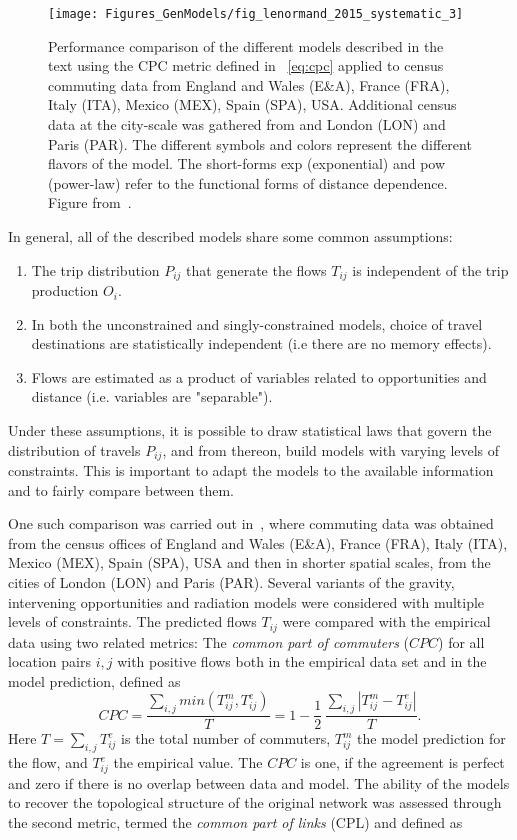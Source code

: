 \begin{figure}[t!]
\centering
\texttt{[image: Figures\_GenModels/fig\_lenormand\_2015\_systematic\_3]}
\caption{Performance comparison of the different models described in the text using the CPC metric defined in \equationname~\eqref{eq:cpc} applied to census commuting data from England and Wales (E\&A), France (FRA), Italy (ITA), Mexico (MEX), Spain (SPA), USA. Additional census data at the city-scale was gathered from and London (LON) and Paris (PAR). The different symbols and colors represent the different flavors of the model. The short-forms exp (exponential) and pow (power-law) refer to the functional forms of distance dependence. Figure from~\cite{lenormand_2015_systematic}. 
\label{fig:lenormand_2015_systematic_3}}
\end{figure}

In general, all of the described models share some common assumptions:
\begin{enumerate}
\item The trip distribution $P_{ij}$ that generate the flows $T_{ij}$ is independent of the trip production $O_i$.
\item In both the unconstrained and singly-constrained models, choice of travel destinations are statistically independent (i.e there are no memory effects).  
\item Flows are estimated as a product of variables related to opportunities and distance (i.e. variables are "separable").
\end{enumerate}
Under these assumptions, it is possible to draw statistical laws that govern the distribution of travels $P_{ij}$, and from thereon, build models with varying levels of constraints. This is important to adapt the models to the available information and to fairly compare between them.

One such comparison was carried out in~\cite{lenormand_2015_systematic}, where commuting data was obtained from the census offices of England and Wales (E\&A), France (FRA), Italy (ITA), Mexico (MEX), Spain (SPA), USA and then in shorter spatial scales, from the cities of London (LON) and Paris (PAR). Several variants of the gravity, intervening opportunities and radiation models were considered with multiple levels of constraints. The predicted flows $T_{ij}$ were compared with the empirical data using two related metrics: The \emph{common part of commuters} ($CPC$) for all location pairs $i,j$ with positive flows both in the empirical data set and in the model prediction, defined as
\begin{equation}
CPC = \frac{\sum_{i,j} min (T^m_{ij}, T^e_{ij})}{T} = 1 - \frac{1}{2} \, \frac{\sum_{i,j} |T^m_{ij}-T^e_{ij}|}{T}.
\label{eq:cpc}
\end{equation}      
Here $T = \sum_{i,j} T^e_{ij}$ is the total number of commuters, $T^m_{ij}$ the model prediction for the flow, and $T^e_{ij}$ the empirical value. The $CPC$ is one, if the agreement is perfect and zero if there is no overlap between data and model. The ability of the models to
recover the topological structure of the original network was assessed through the second metric, termed the \emph{common part of links}
(CPL) and defined as

